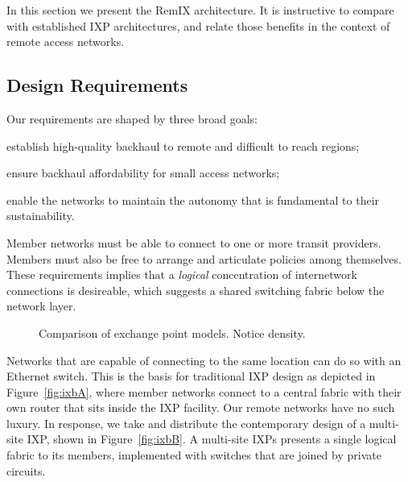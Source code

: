 In this section we present the RemIX architecture. It is instructive
to compare with established IXP architectures, and relate those
benefits in the context of remote access networks.

\subsection{Design Requirements}

Our requirements are shaped by three broad goals:
\begin{inparaenum}[(i)]
  \item establish high-quality backhaul to remote and difficult to
    reach regions;
  \item ensure backhaul affordability for small access networks;
  \item enable the networks to maintain the autonomy that is
    fundamental to their sustainability.
\end{inparaenum}
Member networks must be able to connect to one or more transit providers.
Members must also be free to arrange and articulate policies among themselves.
These requirements implies that a \emph{logical} concentration of internetwork
connections is desireable, which suggests a shared switching fabric below the
network layer.

\begin{figure*}
   \hfill
   \hfill
  \subfloat[RemIX]{
    \resizebox{0.6\columnwidth}{!}{
      \begin{tikzpicture}
        \ixboxesC
      \end{tikzpicture}
      \label{fig:ixbC}
    }
  }
  \caption{Comparison of exchange point models. Notice density.}
  \label{fig:ixb}
\end{figure*}

Networks that are capable of connecting to the same location can do so with an
Ethernet switch. This is the basis for traditional \ac{IXP} design as depicted
in Figure~\ref{fig:ixbA}, where member networks connect to a central fabric
with their own router that sits inside the IXP facility. Our remote networks
have no such luxury. In response, we take and distribute the contemporary design
of a multi-site \ac{IXP}, shown in Figure~\ref{fig:ixbB}. A multi-site \acp{IXP}
presents a single logical fabric to its members, implemented with switches
that are joined by private circuits.

